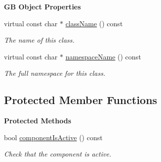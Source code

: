 \begin{Indent}\textbf{ GB Object Properties}\par
\begin{DoxyCompactItemize}
\item 
virtual const char $\ast$ \mbox{\hyperlink{classrev_1_1_scripted_process_acf76a8590e80b9cf16c155639d721065}{class\+Name}} () const
\begin{DoxyCompactList}\small\item\em The name of this class. \end{DoxyCompactList}\item 
virtual const char $\ast$ \mbox{\hyperlink{classrev_1_1_scripted_process_a160dbc327ce205f9999d8c5c276559a9}{namespace\+Name}} () const
\begin{DoxyCompactList}\small\item\em The full namespace for this class. \end{DoxyCompactList}\end{DoxyCompactItemize}
\end{Indent}
\subsection*{Protected Member Functions}
\begin{Indent}\textbf{ Protected Methods}\par
\begin{DoxyCompactItemize}
\item 
\mbox{\label{classrev_1_1_scripted_process_a9acda2f211086afc52555baa2d975e52}} 
bool \mbox{\hyperlink{classrev_1_1_scripted_process_a9acda2f211086afc52555baa2d975e52}{component\+Is\+Active}} () const
\begin{DoxyCompactList}\small\item\em Check that the component is active. \end{DoxyCompactList}\end{DoxyCompactItemize}
\end{Indent}
